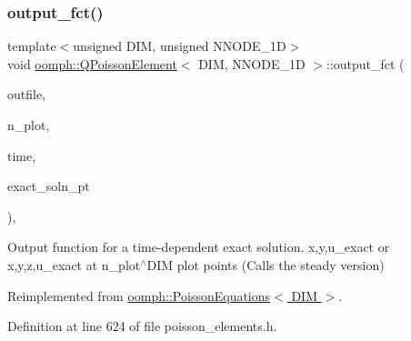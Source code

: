 \mbox{\label{classoomph_1_1QPoissonElement_a11884e74fcb40b630380daa52aa6d2d7}} 
\subsubsection{\texorpdfstring{output\+\_\+fct()}{output\_fct()}\hspace{0.1cm}{\footnotesize\ttfamily [2/2]}}
{\footnotesize\ttfamily template$<$unsigned D\+IM, unsigned N\+N\+O\+D\+E\+\_\+1D$>$ \\
void \hyperlink{classoomph_1_1QPoissonElement}{oomph\+::\+Q\+Poisson\+Element}$<$ D\+IM, N\+N\+O\+D\+E\+\_\+1D $>$\+::output\+\_\+fct (\begin{DoxyParamCaption}\item[{std\+::ostream \&}]{outfile,  }\item[{const unsigned \&}]{n\+\_\+plot,  }\item[{const double \&}]{time,  }\item[{\hyperlink{classoomph_1_1FiniteElement_ad4ecf2b61b158a4b4d351a60d23c633e}{Finite\+Element\+::\+Unsteady\+Exact\+Solution\+Fct\+Pt}}]{exact\+\_\+soln\+\_\+pt }\end{DoxyParamCaption})\hspace{0.3cm}{\ttfamily [inline]}, {\ttfamily [virtual]}}



Output function for a time-\/dependent exact solution. x,y,u\+\_\+exact or x,y,z,u\+\_\+exact at n\+\_\+plot$^\wedge$\+D\+IM plot points (Calls the steady version) 



Reimplemented from \hyperlink{classoomph_1_1PoissonEquations_a6d98964a14b38f4b2e89a2744478f706}{oomph\+::\+Poisson\+Equations$<$ D\+I\+M $>$}.



Definition at line 624 of file poisson\+\_\+elements.\+h.

\mbox{\label{classoomph_1_1QPoissonElement_a2ed068f90e2e7c576f44098a9bec08a6}} 
